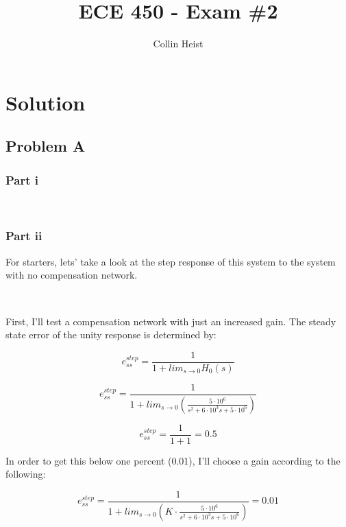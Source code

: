 \documentclass[11pt]{article}
\author{Collin Heist}
\title{ECE 450 - Exam \#2}
\begin{document}
    
    
    \maketitle
    
    

    

\section{Solution}
\subsection{Problem A}
\subsubsection{Part i}

 \begin{center}
    \end{center}
    { \hspace*{\fill} \\}
    
\subsubsection{Part ii}
For starters, lets' take a look at the step response of this system to
the system with no compensation network.

    \begin{center}
    \end{center}
    { \hspace*{\fill} \\}
    
    First, I'll test a compensation network with just an increased gain. The
steady state error of the unity response is determined by:

\[e_{ss}^{step}=\frac{1}{1+lim_{s\to 0}H_0(s)}\]

\[e_{ss}^{step}=\frac{1}{1+lim_{s\to 0}(\frac{5\cdot 10^6}{s^2+6\cdot 10^3s+5\cdot 10^6})}\]

\[e_{ss}^{step}=\frac{1}{1+1}=0.5\]

In order to get this below one percent (0.01), I'll choose a gain
according to the following:

\[e_{ss}^{step}=\frac{1}{1+lim_{s\to 0}(K\cdot \frac{5\cdot 10^6}{s^2+6\cdot 10^3s+5\cdot 10^6})}=0.01\]
\end{document}
